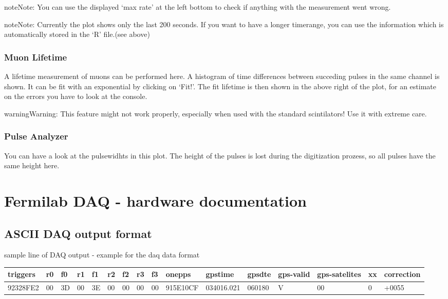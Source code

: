 \documentclass[letterpaper,10pt,english]{sphinxmanual}
\begin{document}
\begin{notice}{note}{Note:}
You can use the displayed `max rate' at the left bottom to check if anything with the measurement went wrong.
\end{notice}

\begin{notice}{note}{Note:}
Currently the plot shows only the last 200 seconds. If you want to have a longer timerange, you can use the information which is automatically stored in the `R' file.(see above)
\end{notice}


\subsubsection{Muon Lifetime}
\label{tutorial:muon-lifetime}
A lifetime measurement of muons can be performed here. A histogram of time differences between succeding pulses in the same channel is shown. It can be fit with an exponential by clicking on `Fit!'. The fit lifetime is then shown in the above right of the plot, for an estimate on the errors you have to look at the console.

\begin{notice}{warning}{Warning:}
This feature might not work properly, especially when used with the standard scintilators! Use it with extreme care.
\end{notice}


\subsubsection{Pulse Analyzer}
\label{tutorial:pulse-analyzer}
You can have a look at the pulsewidhts in this plot. The height of the pulses is lost during the digitization prozess, so all pulses have the same height here.


\section{Fermilab DAQ - hardware documentation}
\label{hardware:fermilab-daq-hardware-documentation}\label{hardware::doc}

\subsection{ASCII DAQ output format}
\label{hardware:ascii-daq-output-format}
sample line of DAQ output - example for the daq data format

\begin{tabulary}{\linewidth}{|L|L|L|L|L|L|L|L|L|L|L|L|L|L|L|L|}
\hline
\textbf{
triggers
} & \textbf{
r0
} & \textbf{
f0
} & \textbf{
r1
} & \textbf{
f1
} & \textbf{
r2
} & \textbf{
f2
} & \textbf{
r3
} & \textbf{
f3
} & \textbf{
onepps
} & \textbf{
gpstime
} & \textbf{
gpsdte
} & \textbf{
gps-valid
} & \textbf{
gps-satelites
} & \textbf{
xx
} & \textbf{
correction
}\\\hline

92328FE2
 & 
00
 & 
3D
 & 
00
 & 
3E
 & 
00
 & 
00
 & 
00
 & 
00
 & 
915E10CF
 & 
034016.021
 & 
060180
 & 
V
 & 
00
 & 
0
 & 
+0055
\\\hline
\end{tabulary}
\end{document}
